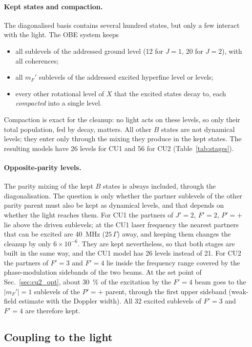 \documentclass[11pt,a4paper,oneside]{report}
\begin{document}
\paragraph{Kept states and compaction.} The diagonalised basis contains several hundred states, but
only a few interact with the light. The OBE system keeps
\begin{itemize}[itemsep=1pt]
  \item all sublevels of the addressed ground level (12 for $J=1$, 20 for $J=2$), with all
        coherences;
  \item all $m_F'$ sublevels of the addressed excited hyperfine level or levels;
  \item every other rotational level of $X$ that the excited states decay to, each
        \emph{compacted} into a single level.
\end{itemize}
Compaction is exact for the cleanup: no light acts on these levels, so only their total population,
fed by decay, matters. All other $B$ states are not dynamical levels; they enter only through the
mixing they produce in the kept states. The resulting models have 26 levels for CU1 and 56 for CU2
(Table~\ref{tab:stages}).

\paragraph{Opposite-parity levels.} The parity mixing of the kept $B$ states is always included,
through the diagonalisation. The question is only whether the partner sublevels of the other parity
parent must also be kept as dynamical levels, and that depends on whether the light reaches them.
For CU1 the partners of $J'=2$, $F'=2$, $P'=+$ lie above the driven sublevels; at the CU1 laser
frequency the nearest partners that can be excited are \SI{40}{MHz} ($25\,\Gamma$) away, and keeping
them changes the cleanup by only $6\times10^{-6}$. They are kept nevertheless, so that both stages
are built in the same way, and the CU1 model has 26 levels instead of 21. For CU2 the partners
of $F'=3$ and $F'=4$ lie inside the frequency range covered by the phase-modulation sidebands of the
two beams. At the set point of Sec.~\ref{sec:cu2_opt}, about \SI{30}{\percent} of the excitation by
the $F'=4$ beam goes to the $|m_F'|=1$ sublevels of the $P'=+$ parent, through the first upper
sideband (weak-field estimate with the Doppler width). All 32 excited sublevels of $F'=3$ and $F'=4$
are therefore kept.

\subsection{Coupling to the light}
\label{sec:model_coupling}
\end{document}
